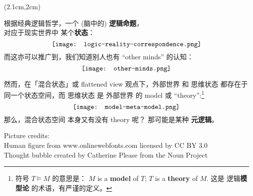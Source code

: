 \begin{preview}
\begin{minipage}{\textwidth}
	
\setlength{\parskip}{0.4\baselineskip}
\begin{textblock*}{20cm}(2.1cm,2cm) %
{}
\hspace{8cm}
\end{textblock*}
\vspace*{0.3cm} 

根据经典逻辑哲学，一个 (脑中的) \textbf{逻辑命题}，\\
对应于现实世界中 某个\textbf{状态}：
\begin{equation}
\vcenter{\hbox{\texttt{[image: logic-reality-correspondence.png]}}}
\end{equation}
而这亦可以推广到，我们知道别人也有 ``other minds'' 的认知：
\begin{equation}
\vcenter{\hbox{\texttt{[image: other-minds.png]}}}
\end{equation}

\setcounter{mpfootnote}{2}
然而，在「混合状态」或 flattened view 观点下，外部世界 和 思维状态 都存在于同一个状态空间，而 思维状态 是 外部世界 的 model 或 ``theory'':\footnote{符号 $T \models M$ 的意思是： $M$ is a \textbf{model} of $T$; $T$ is a \textbf{theory} of $M$.  这是 逻辑\textbf{模型论} 的术语，有严谨的定义。}
\begin{equation}
\vcenter{\hbox{\texttt{[image: model-meta-model.png]}}}
\end{equation}
那么，混合状态空间 本身又有没有 theory 呢？ 那可能是某种 \textbf{元逻辑}。

\footnotesize
Picture credits:\\
Human figure from www.onlinewebfonts.com licensed by CC BY 3.0\\
Thought bubble created by Catherine Please from the Noun Project
\end{minipage}
\end{preview}

